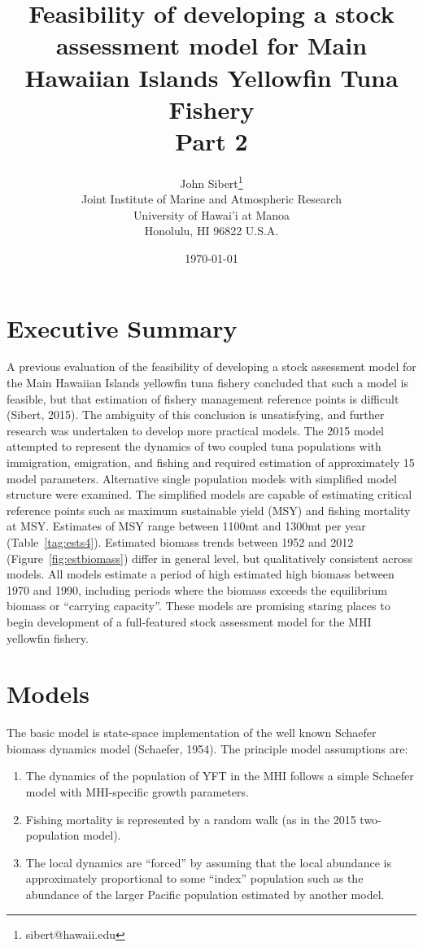 \documentclass[12pt,letterpaper,twoside]{article}
\title{Feasibility of developing a stock assessment model for Main
Hawaiian Islands Yellowfin Tuna Fishery\\
\vspace{2ex}
Part 2}
\author{
John Sibert\thanks{sibert@hawaii.edu}\\
Joint Institute of Marine and Atmospheric Research\\
University of Hawai'i at Manoa\\
Honolulu, HI  96822 U.S.A.\\[0.125in]
\date{\today}
}
\newcommand\doublespacing{\baselineskip=1.6\normalbaselineskip}
\begin{document}
\maketitle



\section{Executive Summary}
A previous evaluation of the feasibility of developing a
stock assessment model for the Main Hawaiian Islands yellowfin tuna
fishery concluded that such a model is feasible, but that estimation of
fishery management reference points is difficult (Sibert, 2015).
The ambiguity of this
conclusion is unsatisfying, and further research was undertaken to
develop more practical models. The 2015 model attempted to represent
the dynamics of two coupled tuna populations with immigration,
emigration, and fishing and required estimation of approximately 15
model parameters.
Alternative single population models with simplified model
structure
were examined. The simplified models are capable of
estimating critical reference points such as maximum sustainable
yield (MSY) and fishing mortality at MSY. Estimates of MSY range
between 1100mt and 1300mt per year (Table~\ref{tag:ests4}).
Estimated biomass trends between 1952 and 2012 
(Figure~\ref{fig:estbiomass}) differ in general level, but
qualitatively consistent across models. All models estimate a period of high
estimated high biomass between 1970 and 1990, 
including periods where the biomass exceeds the
equilibrium biomass or ``carrying capacity''. 
These models are
promising staring places to begin development of a full-featured stock
assessment model for the MHI yellowfin fishery.

\section{Models}
The basic model is  state-space implementation of the well known
Schaefer biomass dynamics model (Schaefer, 1954).
The principle model assumptions are:
\begin{enumerate}
\item The dynamics of the population of YFT in the MHI follows a
simple Schaefer model with MHI-specific growth parameters.
\item Fishing mortality is represented by a random walk (as in the
2015 two-population model).
\item The local dynamics are ``forced'' by assuming that the local
abundance is approximately proportional to some ``index'' population
such as the abundance of the larger Pacific population estimated by
another model.
\end{enumerate}
\end{document}
